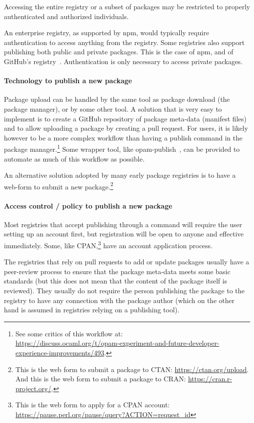 Accessing the entire registry or a subset of packages may be restricted to properly authenticated and authorized individuals.

An enterprise registry, as supported by npm, would typically require authentication to access anything from the registry.
Some registries also support publishing both public and private packages.
This is the case of npm, and of GitHub's registry~\cite{github_registry}.
Authentication is only necessary to access private packages.

\paragraph{Technology to publish a new package}

Package upload can be handled by the same tool as package download (the package manager), or by some other tool.
A solution that is very easy to implement is to create a GitHub repository of package meta-data (manifest files) and to allow uploading a package by creating a pull request.
For users, it is likely however to be a more complex workflow than having a publish command in the package manager.\footnote{
	See some critics of this workflow at:\\ \url{https://discuss.ocaml.org/t/opam-experiment-and-future-developer-experience-improvements/493}.
}
Some wrapper tool, like opam-publish~\cite{opam-publish}, can be provided to automate as much of this workflow as possible.

An alternative solution adopted by many early package registries is to have a web-form to submit a new package.\footnote{
	This is the web form to submit a package to CTAN: \url{https://ctan.org/upload}.
	And this is the web form to submit a package to CRAN: \url{https://cran.r-project.org/}.
}

\paragraph{Access control / policy to publish a new package}

Most registries that accept publishing through a command will require the user setting up an account first, but registration will be open to anyone and effective immediately.
Some, like CPAN,\footnote{
	This is the web form to apply for a CPAN account: \url{https://pause.perl.org/pause/query?ACTION=request\_id}
} have an account application process.

The registries that rely on pull requests to add or update packages usually have a peer-review process to ensure that the package meta-data meets some basic standards (but this does not mean that the content of the package itself is reviewed).
They usually do not require the person publishing the package to the registry to have any connection with the package author (which on the other hand is assumed in registries relying on a publishing tool).

